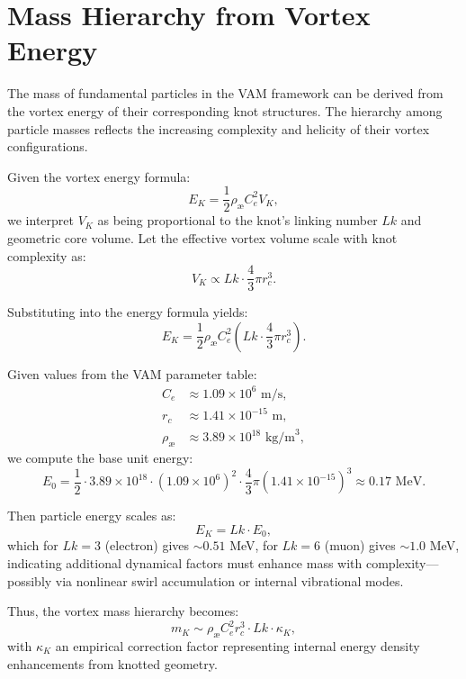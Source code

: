 
\section{Mass Hierarchy from Vortex Energy}

The mass of fundamental particles in the VAM framework can be derived from the vortex energy of their corresponding knot structures. The hierarchy among particle masses reflects the increasing complexity and helicity of their vortex configurations.

Given the vortex energy formula:
\begin{equation}
    E_K = \frac{1}{2} \rho_{\text{\ae}} C_e^2 V_K,
\end{equation}
we interpret $V_K$ as being proportional to the knot's linking number $Lk$ and geometric core volume. Let the effective vortex volume scale with knot complexity as:
\begin{equation}
    V_K \propto Lk \cdot \frac{4}{3} \pi r_c^3.
\end{equation}

Substituting into the energy formula yields:
\begin{equation}
    E_K = \frac{1}{2} \rho_{\text{\ae}} C_e^2 \left( Lk \cdot \frac{4}{3} \pi r_c^3 \right).
\end{equation}

Given values from the VAM parameter table:
\begin{align*}
    C_e &\approx 1.09 \times 10^6 \text{ m/s}, \\
    r_c &\approx 1.41 \times 10^{-15} \text{ m}, \\
    \rho_{\text{\ae}} &\approx 3.89 \times 10^{18} \text{ kg/m}^3,
\end{align*}
we compute the base unit energy:
\begin{equation}
    E_0 = \frac{1}{2} \cdot 3.89 \times 10^{18} \cdot (1.09 \times 10^6)^2 \cdot \frac{4}{3} \pi (1.41 \times 10^{-15})^3 \approx 0.17 \text{ MeV}.
\end{equation}

Then particle energy scales as:
\begin{equation}
    E_K = Lk \cdot E_0,
\end{equation}
which for $Lk=3$ (electron) gives $\sim 0.51$ MeV, for $Lk=6$ (muon) gives $\sim 1.0$ MeV, indicating additional dynamical factors must enhance mass with complexity—possibly via nonlinear swirl accumulation or internal vibrational modes.

Thus, the vortex mass hierarchy becomes:
\begin{equation}
    m_K \sim \rho_{\text{\ae}} C_e^2 r_c^3 \cdot Lk \cdot \kappa_K,
\end{equation}
with $\kappa_K$ an empirical correction factor representing internal energy density enhancements from knotted geometry.